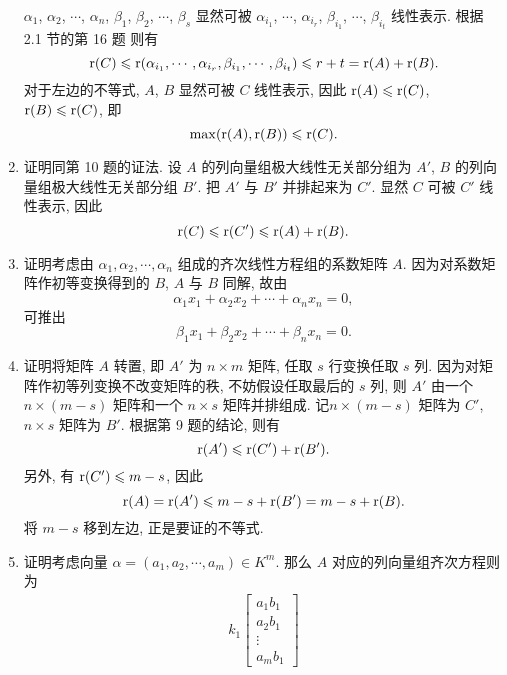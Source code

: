 \begin{enumerate}
        $\alpha_1$, $\alpha_2$, $\cdots$, $\alpha_n$, $\beta_1$, $\beta_2$, $\cdots$, $\beta_s$ 显然可被 $\alpha_{i_1}$, $\cdots$, $\alpha_{i_r}$, $\beta_{i_1}$, $\cdots$, $\beta_{i_t}$ 线性表示.
        根据 2.1 节的第 16 题 则有
        \[
            \mathrm{r}(C) \leqslant \mathrm{r}(\alpha_{i_1}, \cdots, \alpha_{i_r}, \beta_{i_1}, \cdots, \beta_{i_t}) \leqslant r + t = \mathrm{r}(A) + \mathrm{r}(B).    
        \]
        对于左边的不等式, $A$, $B$ 显然可被 $C$ 线性表示, 因此 $\mathrm{r}(A) \leqslant \mathrm{r}(C)$, $\mathrm{r}(B) \leqslant \mathrm{r}(C)$, 即
        \[
            \max(\mathrm{r}(A), \mathrm{r}(B)) \leqslant \mathrm{r}(C).    
        \]
    \item %
        {\heiti 证明}\quad 同第 10 题的证法. 设 $A$ 的列向量组极大线性无关部分组为 $A'$, $B$ 的列向量组极大线性无关部分组 $B'$.
        把 $A'$ 与 $B'$ 并排起来为 $C'$. 显然 $C$ 可被 $C'$ 线性表示, 因此
        \[
            \mathrm{r}(C) \leqslant \mathrm{r}(C') \leqslant \mathrm{r}(A) + \mathrm{r}(B).    
        \]
    \item %
        {\heiti 证明}\quad 考虑由 $\alpha_1, \alpha_2, \cdots, \alpha_n$ 组成的齐次线性方程组的系数矩阵 $A$.
        因为对系数矩阵作初等变换得到的 $B$, $A$ 与 $B$ 同解, 故由
        \[
            \alpha_1x_1 + \alpha_2x_2 + \cdots + \alpha_nx_n = 0,    
        \]
        可推出
        \[
            \beta_1x_1 + \beta_2x_2 + \cdots + \beta_nx_n = 0.    
        \]
    \item %
        {\heiti 证明}\quad 将矩阵 $A$ 转置, 即 $A'$ 为 $n \times m$ 矩阵, 任取 $s$ 行变换任取 $s$ 列.
        因为对矩阵作初等列变换不改变矩阵的秩, 不妨假设任取最后的 $s$ 列, 则 $A'$ 由一个 $n \times (m-s)$ 矩阵和一个 $n \times s$ 矩阵并排组成.
        记$n \times (m-s)$ 矩阵为 $C'$, $n \times s$ 矩阵为 $B'$. 根据第 9 题的结论, 则有
        \[
            \mathrm{r}(A') \leqslant \mathrm{r}(C') + \mathrm{r}(B').    
        \]
        另外, 有 $\mathrm{r}(C') \leqslant m - s$, 因此
        \[
            \mathrm{r}(A) = \mathrm{r}(A') \leqslant m - s + \mathrm{r}(B') = m - s + \mathrm{r}(B).
        \] 
        将 $m - s$ 移到左边, 正是要证的不等式.
    \item %
        {\heiti 证明}\quad 考虑向量 $\alpha = (a_1, a_2, \cdots, a_m) \in K^m$. 那么 $A$ 对应的列向量组齐次方程则为
        \begin{align*}
            k_1
            \begin{bmatrix}
                a_1b_1 \\
                a_2b_1 \\
                \vdots \\
                a_mb_1 

\end{bmatrix}
\end{align*}
\end{enumerate}
